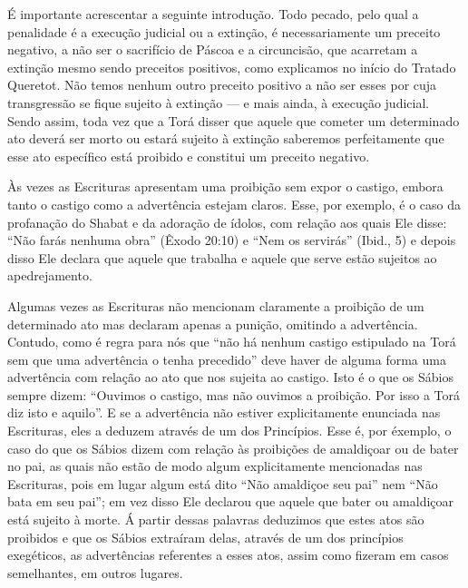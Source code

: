 É importante acrescentar a seguinte introdução. Todo pecado, pelo qual a
penalidade é a execução judicial ou a extinção, é necessariamente um
preceito negativo, a não ser o sacrifício de Páscoa e a circuncisão, que
acarretam a extinção mesmo sendo preceitos positivos, como explicamos
no início do Tratado Queretot. Não temos nenhum outro preceito positivo
a não ser esses por cuja transgressão se fique sujeito à extinção --- e
mais ainda, à execução judicial. Sendo assim, toda vez que a Torá
disser que aquele que cometer um determinado ato deverá ser morto ou
estará sujeito à extinção saberemos perfeitamente que esse ato
específico está proibido e constitui um preceito negativo.

Às vezes as Escrituras apresentam uma proibição sem expor o castigo,
embora tanto o castigo como a advertência estejam claros. Esse, por
exemplo, é o caso da profanação do Shabat e da adoração de ídolos, com
relação aos quais Ele disse: ``Não farás nenhuma obra'' (Êxodo 20:10) e
``Nem os servirás'' (Ibid., 5) e depois disso Ele declara que aquele
que trabalha e aquele que serve estão sujeitos ao apedrejamento.

Algumas vezes as Escrituras não mencionam claramente a proibição de um
determinado ato mas declaram apenas a punição, omitindo a advertência.
Contudo, como é regra para nós que ``não há nenhum castigo estipulado na
Torá sem que uma advertência o tenha precedido'' deve haver de alguma
forma uma advertência com relação ao ato que nos sujeita ao castigo.
Isto é o que os Sábios sempre dizem: ``Ouvimos o castigo, mas não
ouvimos a proibição. Por isso a Torá diz isto e aquilo''. E se a
advertência não estiver explicitamente enunciada nas Escrituras, eles a
deduzem através de um dos Princípios. Esse é, por éxemplo, o caso do que
os Sábios dizem com relação às proibições de amaldiçoar ou de bater no
pai, as quais não estão de modo algum explicitamente mencionadas nas
Escrituras, pois em lugar algum está dito ``Não amaldiçoe seu pai'' nem
``Não bata em seu pai''; em vez disso Ele declarou que aquele que bater
ou amaldiçoar está sujeito à morte. Á partir dessas palavras deduzimos
que estes atos são proibidos e que os Sábios extraíram delas, através de
um dos princípios exegéticos, as advertências referentes a esses atos,
assim como fizeram em casos semelhantes, em outros lugares.

